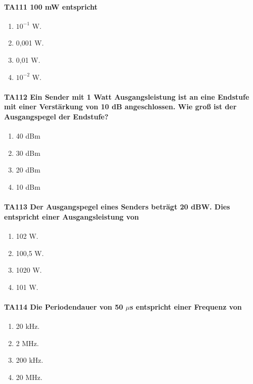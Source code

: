 \documentclass[8pt]{article}
\begin{document}
\begin{enumerate}
\paragraph*{TA111 100 mW entspricht}
\begin{enumerate}[nolistsep,label=\Alph*]
\item $10^{-1}$ W.
\item 0,001 W.
\item 0,01 W.
\item $10^{-2}$ W.
\end{enumerate}



\paragraph*{TA112 Ein Sender mit 1 Watt Ausgangsleistung ist an eine Endstufe mit einer Verstärkung von 10 dB angeschlossen. Wie groß ist der Ausgangspegel der Endstufe?}
\begin{enumerate}[nolistsep,label=\Alph*]
\item 40 dBm
\item 30 dBm
\item 20 dBm
\item 10 dBm
\end{enumerate}



\paragraph*{TA113 Der Ausgangspegel eines Senders beträgt 20 dBW. Dies entspricht einer Ausgangsleistung von}
\begin{enumerate}[nolistsep,label=\Alph*]
\item 102 W.
\item 100,5 W.
\item 1020 W.
\item 101 W.
\end{enumerate}



\paragraph*{TA114 Die Periodendauer von 50 $\mu$s entspricht einer Frequenz von}
\begin{enumerate}[nolistsep,label=\Alph*]
\item 20 kHz.
\item 2 MHz.
\item 200 kHz.
\item 20 MHz.
\end{enumerate}




\end{enumerate}
\end{document}
